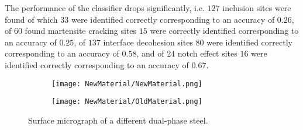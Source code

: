 The performance of the classifier drops significantly, i.e. $127$ inclusion sites were found of which $33$ were identified correctly corresponding to an accuracy of $0.26$, of $60$ found martensite cracking sites $15$ were correctly identified corresponding to an accuracy of $0.25$, of $137$ interface decohesion sites $80$ were identified correctly corresponding to an accuracy of $0.58$, and of $24$ notch effect sites $16$ were identified correctly corresponding to an accuracy of $0.67$. \\

\begin{figure}
\centering
\begin{subfigure}{0.48\textwidth}
\centering
\texttt{[image: NewMaterial/NewMaterial.png]}
\caption{}
\label{sub:NewMaterial}
\end{subfigure}
\centering
\begin{subfigure}{0.48\textwidth}
\centering
\texttt{[image: NewMaterial/OldMaterial.png]}
\caption{}
\label{sub:OldMaterial}
\end{subfigure}
\caption{Surface micrograph of a different dual-phase steel.}
\label{fig:newMaterial}
\end{figure}


